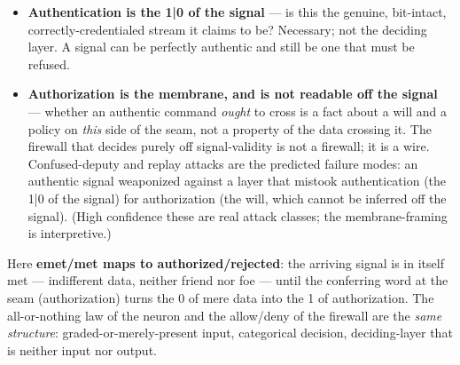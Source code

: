 \documentclass[11pt]{article}
\begin{document}
\begin{itemize}
\item \textbf{Authentication is the 1|0 of the signal} — is this the genuine, bit-intact, correctly-credentialed stream it claims to be? Necessary; not the deciding layer. A signal can be perfectly authentic and still be one that must be refused.
\item \textbf{Authorization is the membrane, and is not readable off the signal} — whether an authentic command \emph{ought} to cross is a fact about a will and a policy on \emph{this} side of the seam, not a property of the data crossing it. The firewall that decides purely off signal-validity is not a firewall; it is a wire. Confused-deputy and replay attacks are the predicted failure modes: an authentic signal weaponized against a layer that mistook authentication (the 1|0 of the signal) for authorization (the will, which cannot be inferred off the signal). (High confidence these are real attack classes; the membrane-framing is interpretive.)
\end{itemize}

Here \textbf{emet/\allowbreak{}met maps to authorized/\allowbreak{}rejected}: the arriving signal is in itself met — indifferent data, neither friend nor foe — until the conferring word at the seam (authorization) turns the 0 of mere data into the 1 of authorization. The all-or-nothing law of the neuron and the allow/\allowbreak{}deny of the firewall are the \emph{same structure}: graded-or-merely-present input, categorical decision, deciding-layer that is neither input nor output.
\end{document}
